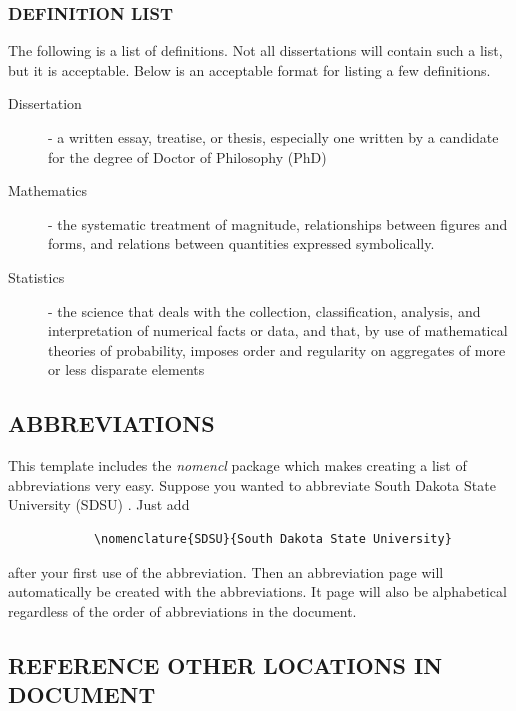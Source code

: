 \documentclass[main.tex]{subfiles}
\begin{document}
        \subsubsection{DEFINITION LIST}
            The following is a list of definitions.  Not all dissertations will contain
            such a list, but it is acceptable.  Below is an acceptable format for
            listing a few definitions. 
            
            \begin{description}
                \item[Dissertation] - a written essay, treatise, or thesis, 
                    especially one written by a candidate for the degree of 
                    Doctor of Philosophy (PhD) 
                \item[Mathematics] - the systematic treatment of magnitude, relationships 
                    between figures and forms, and relations between quantities 
                    expressed symbolically. 
                \item[Statistics] - the science that deals with the collection, 
                    classification, analysis, and interpretation of numerical 
                    facts or data, and that, by use of mathematical theories of 
                    probability, imposes order and regularity on aggregates of 
                    more or less disparate elements
            \end{description}
    
    \subsection{ABBREVIATIONS}
        This template includes the \textit{nomencl} package which makes creating a 
        list of abbreviations very easy.  Suppose you wanted
        to abbreviate South Dakota State University 
        (SDSU) . Just add 
        \begin{verbatim}
            \nomenclature{SDSU}{South Dakota State University}
        \end{verbatim}
        after your first use of the abbreviation.  Then an abbreviation page 
        will automatically be created with the abbreviations.  It page will 
        also be alphabetical regardless of the order of abbreviations in the 
        document.
    
    \subsection{REFERENCE OTHER LOCATIONS IN DOCUMENT}
    
\end{document}
